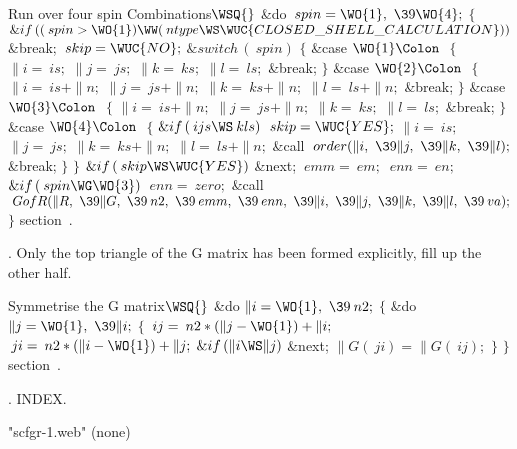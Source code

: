 \WY\WP\4\4Run over four spin Combinations\X \X${}\WSQ{}$\6
\&{do} $\>{spin}=\WO{1},\ \39\WO{4};$\1\7
$\{$\7
\7
$\&{if}\,((\>{spin}>\WO{1})\WW(\>{ntype}\WS\WUC{CLOSED\_SHELL\_CALCULATION}))$%
\1\6
\&{break};\2\6
$\>{skip}=\WUC{NO};$\5
\7
$\&{switch}\,(\>{spin})$ \1\7
$\{$\7
\4\&{case} $\WO{1}\Colon\ $\5
\6
$\{$\6
$\|i=\>{is};$\6
$\|j=\>{js};$\6
$\|k=\>{ks};$\6
$\|l=\>{ls};$\6
\&{break};\6
$\}$\7
\4\&{case} $\WO{2}\Colon\ $\5
\6
$\{$\6
$\|i=\>{is}+\|n;$\6
$\|j=\>{js}+\|n;$\6
$\|k=\>{ks}+\|n;$\6
$\|l=\>{ls}+\|n;$\6
\&{break};\6
$\}$\7
\4\&{case} $\WO{3}\Colon\ $\5
\6
$\{$\6
$\|i=\>{is}+\|n;$\6
$\|j=\>{js}+\|n;$\6
$\|k=\>{ks};$\6
$\|l=\>{ls};$\6
\&{break};\6
$\}$\7
\4\&{case} $\WO{4}\Colon\ $\5
\6
$\{$\6
$\&{if}\,(\>{ijs}\WS\>{kls})$\1\6
$\>{skip}=\WUC{YES};$\2\6
$\|i=\>{is};$\6
$\|j=\>{js};$\6
$\|k=\>{ks}+\|n;$\6
$\|l=\>{ls}+\|n;$\6
\&{call} $\>{order}(\|i,\ \39\|j,\ \39\|k,\ \39\|l);$\6
\&{break};\6
$\}$\7
$\}$\2\5
\7
$\&{if}\,(\>{skip}\WS\WUC{YES})$\1\6
\&{next};\2\5
\7
$\>{emm}=\>{em};$\6
$\>{enn}=\>{en};$\7
\7
$\&{if}\,(\>{spin}\WG\WO{3})$\1\6
$\>{enn}=\>{zero};$\2\7
\7
\&{call} $\>{GofR}(\|R,\ \39\|G,\ \39\>{n2},\ \39\>{emm},\ \39\>{enn},\ \39\|i,%
\ \39\|j,\ \39\|k,\ \39\|l,\ \39\>{va});$\7
$\}$\2\5
\WY\Wendc
\WU section~.
\fi %

. Only the top triangle of the G matrix has been formed
explicitly, fill up the other half.

\WY\WP\4\4Symmetrise the G matrix\X \X${}\WSQ{}$\6
\&{do} $\|i=\WO{1},\ \39\>{n2};$\1\7
$\{$\7
\&{do} $\|j=\WO{1},\ \39\|i;$\1\7
$\{$\7
$\>{ij}=\>{n2}\ast(\|j-\WO{1})+\|i;$\6
$\>{ji}=\>{n2}\ast(\|i-\WO{1})+\|j;$\6
$\&{if}\,(\|i\WS\|j)$\1\6
\&{next};\2\5
\6
$\|G(\>{ji})=\|G(\>{ij});$\7
$\}$\2\6
$\}$\2\WY\Wendc
\WU section~.
\fi %

.  INDEX.
\fi %




  {"scfgr-1.web"} {(none)}
 {\Ratfor}


\FWEBend
